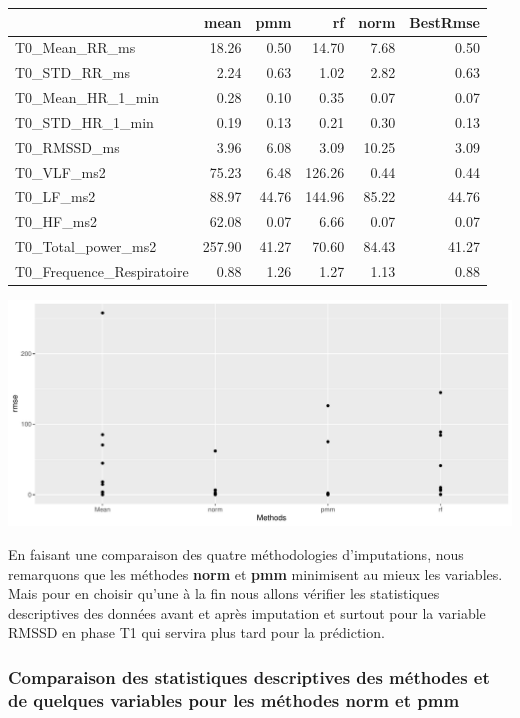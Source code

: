 \documentclass[]{article}
\begin{document}
\begin{table}[H]
\centering
\begin{tabular}{l|r|r|r|r|r}
\hline
  & mean & pmm & rf & norm & BestRmse\\
\hline
T0\_Mean\_RR\_ms & 18.26 & 0.50 & 14.70 & 7.68 & 0.50\\
\hline
T0\_STD\_RR\_ms & 2.24 & 0.63 & 1.02 & 2.82 & 0.63\\
\hline
T0\_Mean\_HR\_1\_min & 0.28 & 0.10 & 0.35 & 0.07 & 0.07\\
\hline
T0\_STD\_HR\_1\_min & 0.19 & 0.13 & 0.21 & 0.30 & 0.13\\
\hline
T0\_RMSSD\_ms & 3.96 & 6.08 & 3.09 & 10.25 & 3.09\\
\hline
T0\_VLF\_ms2 & 75.23 & 6.48 & 126.26 & 0.44 & 0.44\\
\hline
T0\_LF\_ms2 & 88.97 & 44.76 & 144.96 & 85.22 & 44.76\\
\hline
T0\_HF\_ms2 & 62.08 & 0.07 & 6.66 & 0.07 & 0.07\\
\hline
T0\_Total\_power\_ms2 & 257.90 & 41.27 & 70.60 & 84.43 & 41.27\\
\hline
T0\_Frequence\_Respiratoire & 0.88 & 1.26 & 1.27 & 1.13 & 0.88\\
\hline
\end{tabular}
\end{table}

\includegraphics{repport_projet_files/figure-latex/unnamed-chunk-24-1.pdf}

En faisant une comparaison des quatre méthodologies d'imputations, nous
remarquons que les méthodes \textbf{norm} et \textbf{pmm} minimisent au
mieux les variables. Mais pour en choisir qu'une à la fin nous allons
vérifier les statistiques descriptives des données avant et après
imputation et surtout pour la variable RMSSD en phase T1 qui servira
plus tard pour la prédiction.

\hypertarget{comparaison-des-statistiques-descriptives-des-methodes-et-de-quelques-variables-pour-les-methodes-norm-et-pmm}{%
\subsubsection{Comparaison des statistiques descriptives des méthodes et
de quelques variables pour les méthodes norm et
pmm}\label{comparaison-des-statistiques-descriptives-des-methodes-et-de-quelques-variables-pour-les-methodes-norm-et-pmm}}
\end{document}
